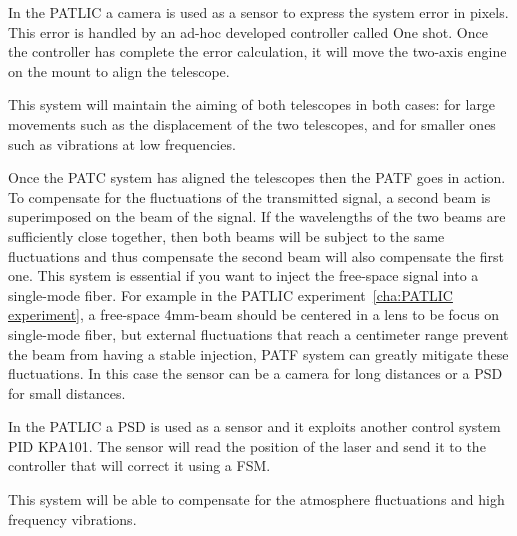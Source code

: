 In the PATLIC a camera is used as a sensor to express the system error in pixels. This error is handled by an ad-hoc developed controller called One shot. Once the controller has complete the error calculation, it will move the two-axis engine on the mount to align the telescope.

This system will maintain the aiming of both telescopes in both cases: for large movements such as the displacement of the two telescopes, and for smaller ones such as vibrations at low frequencies.


Once the PATC system has aligned the telescopes then the PATF goes in action. To compensate for the fluctuations of the transmitted signal, a second beam is superimposed on the beam of the signal. If the wavelengths of the two beams are sufficiently close together, then both beams will be subject to the same fluctuations and thus compensate the second beam will also compensate the first one.
This system is essential if you want to inject the free-space signal into a single-mode fiber. For example in the PATLIC experiment~\ref{cha:PATLIC experiment}, a free-space 4mm-beam should be centered in a lens to be focus on single-mode fiber, but external fluctuations that reach a centimeter range prevent the beam from having a stable injection, PATF system can greatly mitigate these fluctuations.
In this case the sensor can be a camera for long distances or a PSD for small distances.

In the PATLIC a PSD is used as a sensor and it exploits another control system PID KPA101. The sensor will read the position of the laser and send it to the controller that will correct it using a FSM.

This system will be able to compensate for the atmosphere fluctuations and high frequency vibrations.